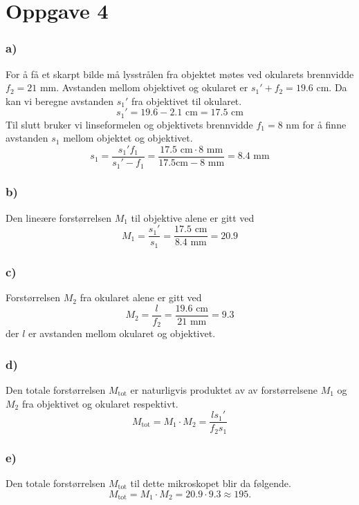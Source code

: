 \documentclass{article}
\begin{document}
\section*{Oppgave 4}
\subsubsection*{a)}
For å få et skarpt bilde må lysstrålen fra objektet møtes ved okularets brennvidde $f_2 = 21$ mm. Avstanden mellom objektivet og okularet er $s_1' + f_2 = 19.6$ cm. Da kan vi beregne avstanden $s_1'$ fra objektivet til okularet.
\[
s_1' = 19.6 - 2.1 \text{ cm} = 17.5 \text{ cm}
\]
Til slutt bruker vi linseformelen og objektivets brennvidde $f_1 = 8$ nm for å finne avstanden $s_1$ mellom objektet og objektivet. 
\[
s_1 = \frac{s_1' f_1}{s_1'  -f_1} = \frac{17.5 \text{ cm} ⋅ 8 \text{ mm}}{17.5 \text{cm} - 8 \text{ mm}} = 8.4 \text{ mm}
\]

\subsubsection*{b)}
Den lineære forstørrelsen $M_1$ til objektive alene er gitt ved 
\[
M_1 = \frac{s_1'}{s_1} = \frac{17.5 \text{ cm}}{8.4 \text{ mm}} = 20.9 
\]

\subsubsection*{c)}
Forstørrelsen $M_2$ fra okularet alene er gitt ved
\[
M_2 = \frac{l}{f_2} = \frac{19.6 \text{ cm}}{21 \text{ mm}} = 9.3
\]
der $l$ er avstanden mellom okularet og objektivet. 

\subsubsection*{d)}
Den totale forstørrelsen $M_{\text{tot}}$ er naturligvis produktet av av forstørrelsene $M_1$ og $M_2$ fra objektivet og okularet respektivt. 
\[
M_{\text{tot}} = M_1 ⋅ M_2 = \frac{ls_1'}{f_2s_1}
\]

\subsubsection*{e)}
Den totale forstørrelsen $M_{\text{tot}}$ til dette mikroskopet blir da følgende. 
\[
M_{\text{tot}} = M_1 ⋅ M_2 = 20.9 ⋅ 9.3 ≈ 195. 
\]
\end{document}
